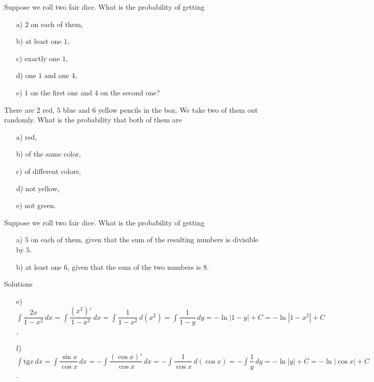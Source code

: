 \begin{problem}
Suppose we roll two fair dice. What is the probability of getting
\begin{enumerate}
    \item[a) ] $2$ on each of them,
    \item[b) ] at least one $1$,
    \item[c) ] exactly one $1$,
    \item[d) ] one $1$ and one $4$,
    \item[e) ] $1$ on the first one and $4$ on the second one?
\end{enumerate}
\end{problem}
\bigskip

\begin{problem}
There are $2$ red, $5$ blue and $6$ yellow pencils in the box. We take two of them out randomly. What is the probability that both of them are
\begin{enumerate}
    \item[a) ] red,
    \item[b) ] of the same color,
    \item[c) ] of different colors,
    \item[d) ] not yellow,
    \item[e) ] not green.
\end{enumerate}
\end{problem}
\bigskip


\begin{problem}
Suppose we roll two fair dice. What is the probability of getting
\begin{enumerate}
    \item[a) ] $5$ on each of them, given that the sum of the resulting numbers is divisible by $5$.
    \item[b) ] at least one $6$, given that the sum of the two numbers is $8$.
\end{enumerate}
\end{problem}

\newpage

\begin{center}
    \begin{large}
        Solutions
    \end{large}
\end{center}


\bigskip

\begin{solution}
\begin{enumerate}
    \item[e) ] $\displaystyle \int \dfrac{2x}{1-x^2} \, dx = \int \dfrac{(x^2)'}{1-x^2} \, dx = \int \dfrac{1}{1-x^2} \, d(x^2) = \int \dfrac{1}{1-y} \, dy=-\ln|1-y|+C=-\ln|1-x^2|+C$,
    \item[f) ] $\displaystyle \int \text{tg}{x} \, dx = \int \dfrac{\sin x}{\cos x} \, dx =  - \int \dfrac{(\cos x)'}{\cos x} \, dx =  - \int \dfrac{1}{\cos x} \, d(\cos x)=  - \int \dfrac{1}{y} \, dy=  - \ln|y|+C=  - \ln|\cos x|+C$.
\end{enumerate}
\end{solution}
\smallskip



